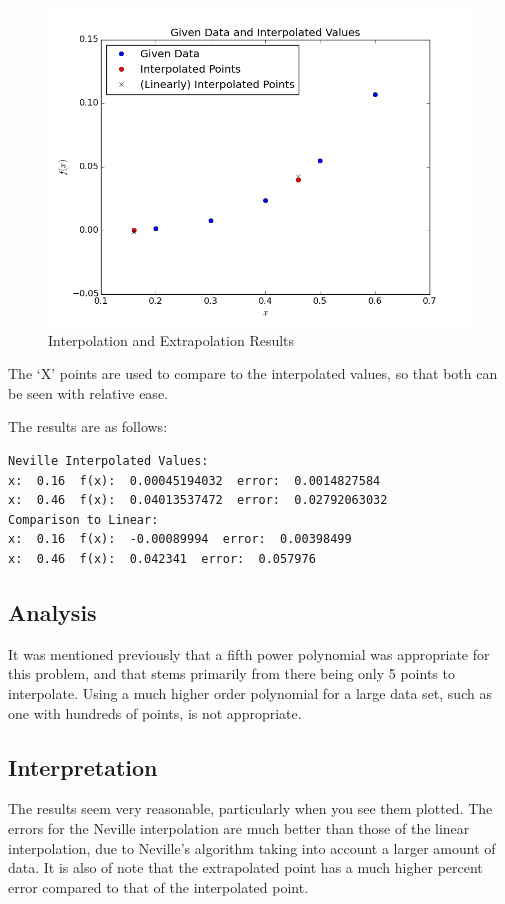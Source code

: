 \documentclass[10pt,letter]{article}
\begin{document}
\begin{figure}[h]
  \centering
    \includegraphics[width=.7\textwidth]{homework1_problem1_plot1}
  \caption{Interpolation and Extrapolation Results}
\end{figure}

The `X' points are used to compare to the interpolated values, so that both can be seen with relative ease.

The results are as follows:

\begin{verbatim}
Neville Interpolated Values:
x:  0.16  f(x):  0.00045194032  error:  0.0014827584
x:  0.46  f(x):  0.04013537472  error:  0.02792063032
Comparison to Linear:
x:  0.16  f(x):  -0.00089994  error:  0.00398499
x:  0.46  f(x):  0.042341  error:  0.057976
\end{verbatim}

\subsection{Analysis}

It was mentioned previously that a fifth power polynomial was appropriate for this problem, and that stems primarily from there being only 5 points to interpolate. Using a much higher order polynomial for a large data set, such as one with hundreds of points, is not appropriate.

\subsection{Interpretation}

The results seem very reasonable, particularly when you see them plotted. The errors for the Neville interpolation are much better than those of the linear interpolation, due to Neville's algorithm taking into account a larger amount of data. It is also of note that the extrapolated point has a much higher percent error compared to that of the interpolated point.
\end{document}
